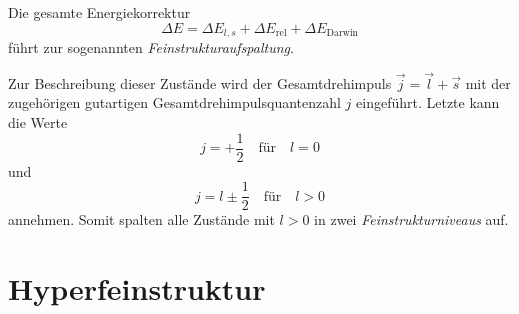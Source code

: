 \documentclass[../bericht.tex]{subfiles}
\begin{document}
      Die gesamte Energiekorrektur
      \begin{equation*}
        \Delta E = \Delta E_{l,s} + \Delta E_\mathrm{rel} + \Delta E_\mathrm{Darwin}
      \end{equation*}
      f\"uhrt zur sogenannten \textit{Feinstrukturaufspaltung}.
      \medskip

      Zur Beschreibung dieser Zust\"ande wird der Gesamtdrehimpuls $\vec{j}=\vec{l}+\vec{s}$ mit der zugeh\"origen gutartigen Gesamtdrehimpulsquantenzahl $j$ eingef\"uhrt. Letzte kann die Werte
      \begin{equation*}
        j=+\frac{1}{2} \quad\text{f\"ur}\quad l=0
      \end{equation*}
      und
      \begin{equation*}
        j=l\pm \frac{1}{2}\quad\text{f\"ur}\quad l>0
      \end{equation*}
      annehmen. Somit spalten alle Zust\"ande mit $l>0$ in zwei \textit{Feinstrukturniveaus} auf.


    \section{Hyperfeinstruktur}
    \label{sec:hyperfeinstruktur}
\end{document}
